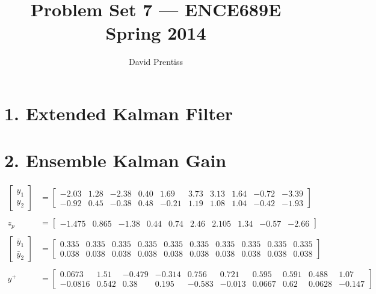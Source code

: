 \documentclass[fleqn, letterpaper]{tufte-handout}
\title{Problem Set 7 --- ENCE689E Spring 2014}
\author{David Prentiss}
\begin{document}
\maketitle

\section{1. Extended Kalman Filter}
\section{2. Ensemble Kalman Gain}
\begin{align*}\begin{bmatrix} y_1 \\ y_2 \end{bmatrix} 
&= \begin{bmatrix} -2.03 & 1.28 & -2.38 & 0.40 & 1.69 & 3.73 & 3.13 & 1.64 & -0.72 & -3.39\\ -0.92 & 0.45 & -0.38 & 0.48 & -0.21 & 1.19 & 1.08 & 1.04 & -0.42 & -1.93 \end{bmatrix} \\\\
z_p 
&= \begin{bmatrix} -1.475 & 0.865 & -1.38 & 0.44 & 0.74 & 2.46 & 2.105 & 1.34 & -0.57 & -2.66 \end{bmatrix} \\\\
\begin{bmatrix} \bar{y}_1 \\ \bar{y}_2 \end{bmatrix} 
&=\begin{bmatrix} 0.335 & 0.335 & 0.335 & 0.335 & 0.335 & 0.335 & 0.335 & 0.335 & 0.335 & 0.335\\ 0.038 & 0.038 & 0.038 & 0.038 & 0.038 & 0.038 & 0.038 & 0.038 & 0.038 & 0.038 \end{bmatrix} \\\\
y^+
&=\begin{bmatrix} 0.0673 & 1.51 & -0.479 & -0.314 & 0.756 & 0.721 & 0.595 & 0.591 & 0.488 & 1.07\\ -0.0816 & 0.542 & 0.38 & 0.195 & -0.583 & -0.013 & 0.0667 & 0.62 & 0.0628 & -0.147 \end{bmatrix}
\end{align*}
\end{document}
